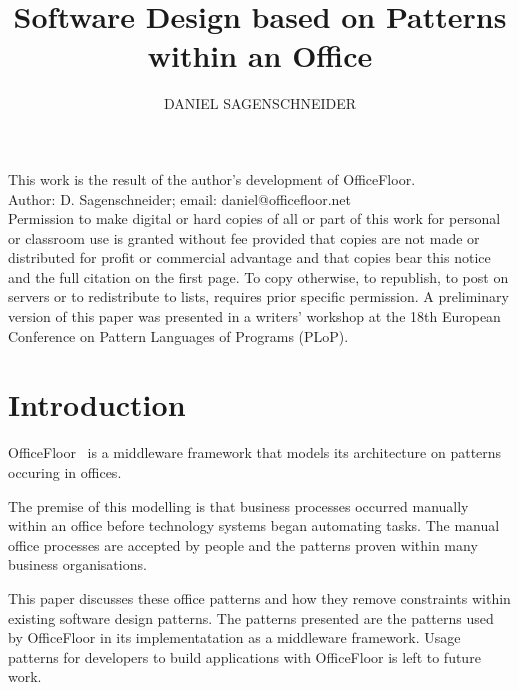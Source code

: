\documentclass[prodmode]{style/acmlarge}
\title{Software Design based on Patterns within an Office}
\author{DANIEL SAGENSCHNEIDER \affil{OfficeFloor, daniel@officefloor.net}}
\begin{document}
\graphicspath{{./pdf/}}

\lstset{language=Java}

\captionsetup[lstlisting]{font=footnotesize}


\begin{bottomstuff}
This work is the result of the author's development of OfficeFloor.\\
Author: D. Sagenschneider; email: daniel@officefloor.net\\

Permission to make digital or hard copies of all or part of this work for
personal or classroom use is granted without fee provided that copies are not
made or distributed for profit or commercial advantage and that copies bear this
notice and the full citation on the first page. To copy otherwise, to republish,
to post on servers or to redistribute to lists, requires prior specific
permission. A preliminary version of this paper was presented in a writers'
workshop at the 18th European Conference on Pattern Languages of Programs
(PLoP).
\end{bottomstuff}

\maketitle



\section{Introduction}

OfficeFloor~\cite{officefloor} is a middleware framework that models its
architecture on patterns occuring in offices.

The premise of this modelling is that business processes occurred manually
within an office before technology systems began automating tasks.  The manual
office processes are accepted by people and the patterns proven within many
business organisations.

This paper discusses these office patterns and how they remove constraints
within existing software design patterns.  The patterns presented are the
patterns used by OfficeFloor in its implementatation as a middleware framework.
Usage patterns for developers to build applications with OfficeFloor is left to
future work.
\end{document}
